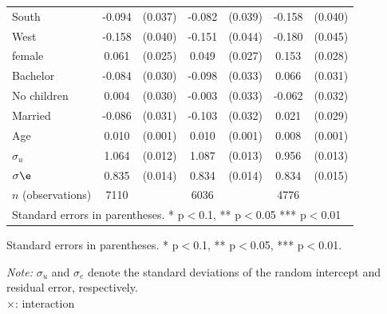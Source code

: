 \documentclass[12pt]{article}
\begin{document}
{\begin{table}[H]
{\begin{tabular}{l*{3}{cc}}
South    &      -0.094\sym{**} &     (0.037)&      -0.082\sym{**} &     (0.039)&      -0.158\sym{***}&     (0.040)\\
West   &      -0.158\sym{***}&     (0.040)&      -0.151\sym{***}&     (0.044)&      -0.180\sym{***}&     (0.045)\\
female    &       0.061\sym{**} &     (0.025)&       0.049\sym{*}  &     (0.027)&       0.153\sym{***}&     (0.028)\\
Bachelor&      -0.084\sym{***}&     (0.030)&      -0.098\sym{***}&     (0.033)&       0.066\sym{**} &     (0.031)\\
No children  &       0.004         &     (0.030)&      -0.003         &     (0.033)&      -0.062\sym{*}  &     (0.032)\\
Married&      -0.086\sym{***}&     (0.031)&      -0.103\sym{***}&     (0.032)&       0.021         &     (0.029)\\
Age         &       0.010\sym{***}&     (0.001)&       0.010\sym{***}&     (0.001)&       0.008\sym{***}&     (0.001)\\
$\sigma_u$     &       1.064\sym{***}&     (0.012)&       1.087\sym{***}&     (0.013)&       0.956\sym{***}&     (0.013)\\
$\sigma\e $    &       0.835\sym{***}&     (0.014)&       0.834\sym{***}&     (0.014)&       0.834\sym{***}&     (0.015)\\

\hline
\(n\) (observations)       &        7110         &            &        6036         &            &        4776         &            \\
\hline\hline
\multicolumn{7}{l}{\footnotesize Standard errors in parentheses. * p$<$0.1, ** p$<$0.05 *** p$<$0.01}\\
\end{tabular}
}


\begin{tablenotes}
            \footnotesize
            \item Standard errors in parentheses. * p$<$0.1, ** p$<$0.05, *** p$<$0.01.
            \item \textit{Note:} $\sigma_u$ and $\sigma_e$ denote the standard deviations of the random intercept and residual error, respectively.\\
            $\times$: interaction\\
        \end{tablenotes}
            \end{table}


\clearpage







}
\end{document}
